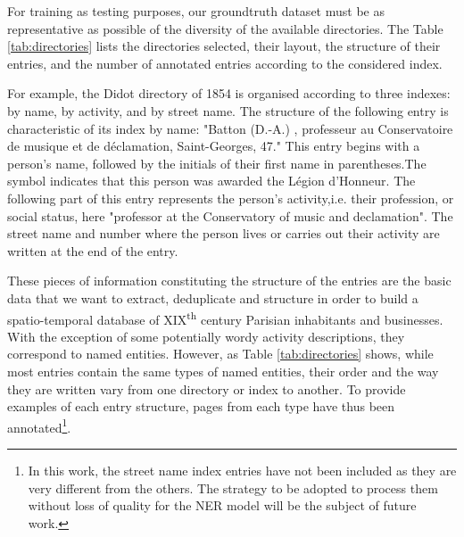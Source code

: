 For training as testing purposes, our groundtruth dataset must be as representative as possible of the diversity of the available directories. The Table \ref{tab:directories} lists the directories selected, their layout, the structure of their entries, and the number of annotated entries according to the considered index.

For example, the Didot directory of 1854 is organised according to three indexes: by name, by activity, and by street name. The structure of the following entry is characteristic of its index by name: "Batton (D.-A.) , professeur au Conservatoire de musique et de déclamation, Saint-Georges, 47." This entry begins with a person's name, followed by the initials of their first name in parentheses.The symbol indicates that this person was awarded the Légion d'Honneur. The following part of this entry represents the person's activity,i.e. their profession, or social status, here "professor at the Conservatory of music and declamation". The street name and number where the person lives or carries out their activity are written at the end of the entry.

These pieces of information constituting the structure of the entries are the basic data that we want to extract, deduplicate and structure in order to build a spatio-temporal database of XIX\textsuperscript{th} century Parisian inhabitants and businesses. With the exception of some potentially wordy activity descriptions, they correspond to named entities. However, as Table \ref{tab:directories} shows, while most entries contain the same types of named entities, their order and the way they are written vary from one directory or index to another. To provide examples of each entry structure, pages from each type have thus been annotated\footnote{In this work, the street name index entries have not been included as they are very different from the others. The strategy to be adopted to process them without loss of quality for the NER model will be the subject of future work.}.

